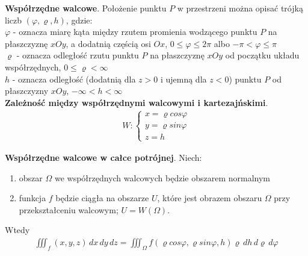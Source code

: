 \documentclass[12pt]{article}
\begin{document}
    \begin{definition}
        \textbf{Współrzędne walcowe}. Położenie punktu $P$ w przestrzeni można opisać trójką liczb $(\varphi, \varrho, h)$, gdzie:\\

        $\varphi$ - oznacza miarę kąta między rzutem promienia wodzącego punktu $P$ na płaszczyznę $xOy$, a dodatnią częścią
        osi $Ox$, $0 \leq \varphi \leq 2 \pi$ albo $-\pi < \varphi \leq \pi$\\

        $\varrho$ - oznacza odległość rzutu punktu $P$ na płaszczyznę $xOy$ od początku układu współrzędnych, $0 \leq \varrho < \infty$\\

        $h$ - oznacza odległość (dodatnią dla $z > 0$ i ujemną dla $z < 0$) punktu $P$ od płaszczyzny $xOy$, $-\infty < h < \infty$\\

        \textbf{Zależność między współrzędnymi walcowymi i kartezajńskimi}.
        \begin{align*}
            W: \begin{cases}
                   x = \varrho cos \varphi \\
                   y = \varrho sin \varphi \\
                   z = h
            \end{cases}
        \end{align*}


        \textbf{Współrzędne walcowe w całce potrójnej}. Niech:
        \begin{enumerate}
            \item obszar $\Omega$ we współrzędnych walcowych będzie obszarem normalnym
            \item funkcja $f$ będzie ciągła na obszarze  $U$, które jest obrazem obszaru $\Omega$ przy przekształceniu
            walcowym; $U = W(\Omega)$.
        \end{enumerate}
        Wtedy
        \begin{align*}
            \iiint_ f(x, y, z)\,dx\,dy\,dz = \iiint_{\Omega} f(\varrho cos \varphi, \varrho sin \varphi, h) \varrho\,dh\,d\varrho\,d\varphi
        \end{align*}
    \end{definition}
\end{document}
